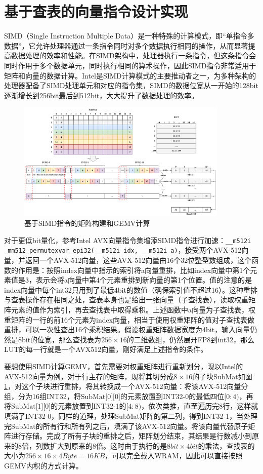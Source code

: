 \section{基于查表的向量指令设计实现}
SIMD（Single Instruction Multiple Data）是一种特殊的计算模式，即“单指令多数据”，它允许处理器通过一条指令同时对多个数据执行相同的操作，从而显著提高数据处理的效率和性能。在SIMD架构中，处理器执行一条指令，但这条指令会同时作用于多个数据单元，同时执行相同的算术操作，因此SIMD指令非常适用于矩阵和向量的数据计算。Intel是SIMD计算模式的主要推动者之一，为多种架构的处理器配备了SIMD处理单元和对应的指令集\cite{IntelAVX}，SIMD的数据位宽从一开始的128bit逐渐增长到256bit最后到512bit，大大提升了数据处理的效率。

\begin{figure}[!htbp]
	\centering
    \includegraphics[width=0.9\textwidth]{figures/SIMD.pdf}
	\caption{基于SIMD指令的矩阵构建和GEMV计算}
    \label{SIMD}
\end{figure}

对于更低bit量化，参考Intel AVX向量指令集增添SIMD指令进行加速：\verb|__m512i _mm512_permutexvar_epi32(__m512i idx, __m512i a)|，接受两个AVX-512向量，并返回一个AVX-512向量，这些AVX-512向量由16个32位整型数组成，这个函数的作用是：按照index向量中指示的索引将a向量重排，比如index向量中第1个元素值是3，表示会将a向量中第4个元素重排到新向量的第1个位置。值的注意的是index向量中每个int32只用到了最低4bit的数值（确保索引值不超过16）。这种重排与查表操作存在相同之处，查表本身也是给出一张向量（子查找表），读取权重矩阵元素的值作为索引，再去查找表中取得乘积。上述函数中a向量为子查找表，权重矩阵的一行的前16个元素为index向量，相当于使用权重矩阵的值对子查找表做重排，可以一次性查出16个乘积结果。假设权重矩阵数据宽度为4bit，输入向量仍然是8bit的位宽，那么查找表为$256\times 16$的二维数组，仍然展开FP8到int32，那么LUT的每一行就是一个AVX512向量，刚好满足上述指令的条件。

要想使用SIMD计算GEMV，首先需要对权重矩阵进行重新划分，现以Intel的AVX-512向量为例，对于行主存的矩阵，现将其切分成$8\times 16$的子块SubMat如图\ref{SIMD}，对这个子块进行重排，将其转换成一个AVX-512向量：将该AVX-512向量分组，分为16组INT32，将$\text{SubMat[0][0]}$的元素放置到INT32-0的最低四位$[0:4)$，再将$\text{SubMat[1][0]}$的元素放置到INT32-1的$[4:8)$，依次类推，直至遍历完8行，这样就填满了INT32-0，同样的道理，处理SubMat矩阵的第二列，得到INT32-1，当处理完SubMat的所有行和所有列之后，填满了该AVX-512向量。将该向量代替原子矩阵进行存储。完成了所有子块的重排之后，矩阵划分结束，其结果是行数减小到原来的8倍，列数扩大到原来的8倍。这时由于执行的是$8bit\times 4bit$的乘法，查找表的大小为$256\times 16\times 4Byte=16KB$，可以完全载入WRAM，因此可以直接按照GEMV内积的方式计算。

